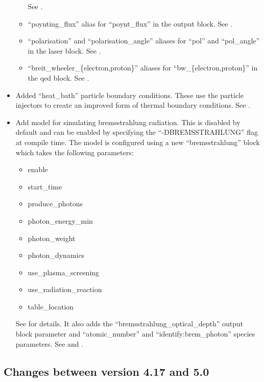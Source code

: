 \begin{itemize}
\begin{itemize}
    See .
\item ``poynting\_flux'' alias for ``poynt\_flux'' in the output block.
    See .
\item ``polarisation'' and ``polarisation\_angle'' aliases for ``pol'' and
    ``pol\_angle'' in the laser block.  See .
\item ``breit\_wheeler\_\{electron,proton\}'' aliases for
    ``bw\_\{electron,proton\}'' in the qed block. See .
\end{itemize}
\item Added ``heat\_bath'' particle boundary conditions. These use the particle
    injectors to create an improved form of thermal boundary conditions.
    See .
\item Add model for simulating bremsstrahlung radiation. This is disabled by
   default and can be enabled by specifying the ``-DBREMSSTRAHLUNG'' flag at
   compile time. The model is configured using a new ``bremsstrahlung'' block
   which takes the following parameters:
\begin{itemize}
\item enable
\item start\_time
\item produce\_photons
\item photon\_energy\_min
\item photon\_weight
\item photon\_dynamics
\item use\_plasma\_screening
\item use\_radiation\_reaction
\item table\_location
\end{itemize}
   See  for details.
   It also adds the ``bremsstrahlung\_optical\_depth'' output block parameter
   and ``atomic\_number'' and ``identify:brem\_photon'' species parameters. See
    and .
\end{itemize}
\bigskip


\subsection{Changes between version 4.17 and 5.0}

